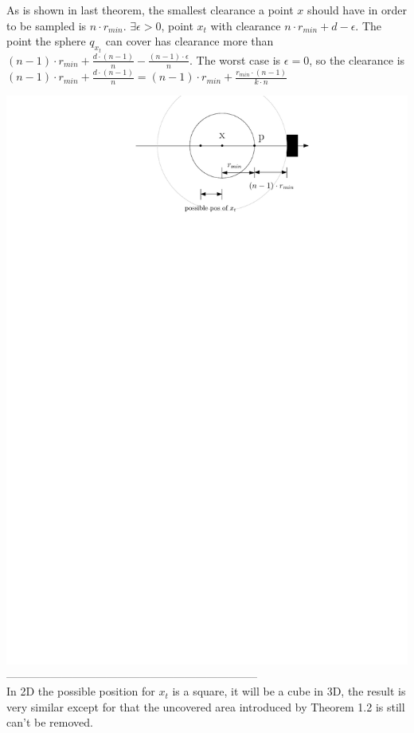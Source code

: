 \documentclass[12pt]{article}
\begin{document}
  As is shown in last theorem, the smallest clearance a point $x$ should have in order to be sampled is $n \cdot r_{min}$. $\exists \epsilon > 0$, point $x_{t}$ with clearance $n \cdot r_{min} + d - \epsilon$. The point the sphere $q_{x_{t}}$ can cover has clearance more than  $(n-1) \cdot r_{min} + \frac{d \cdot (n-1)}{n} - \frac{(n-1) \cdot \epsilon}{n}$. The worst case is $\epsilon = 0$, so the clearance is $(n-1) \cdot r_{min} + \frac{d \cdot (n-1)}{n} = (n-1) \cdot r_{min} + \frac{r_{min} \cdot (n-1)}{k \cdot n}$
    
  \includegraphics[scale=0.8]{sample_1_4}\\
  
  --------------------------------------------------------------------\\  
  
  In 2D the possible position for $x_{t}$ is a square, it will be a cube in 3D, the result is very similar except for that the uncovered area introduced by Theorem 1.2 is still can't be removed.
  
      
\end{document}
